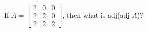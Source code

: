 
%
%
%
%
% 
% 

\question[2] If $A = \left[ 
  \begin{array}{ccc}
    2 & 0 & 0 \\
    2 & 2 & 0 \\
    2 & 2 & 2
  \end{array}
\right]$, then what is adj(adj $A$)?


\ifprintanswers
\fi 

